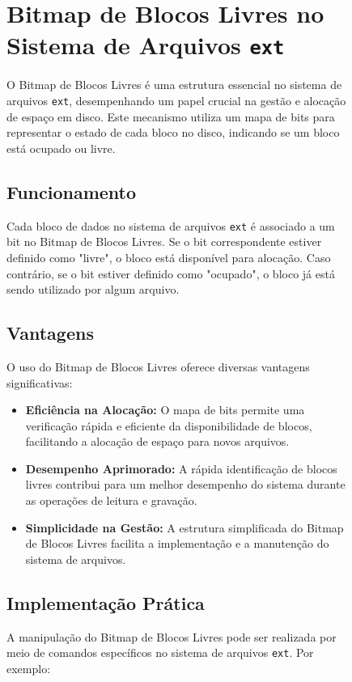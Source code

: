 \documentclass[
	12pt,				%
	openright,			%
	oneside,			%
	a4paper,			%
	chapter=TITLE,		%
	english,			%
	french,				%
	spanish,			%
	brazil				%
	]{abntex2}
\theoremstyle{definition}
\begin{document}
\begin{figure}[H]
    \centering\section{Bitmap de Blocos Livres no Sistema de Arquivos \texttt{ext}}
	O Bitmap de Blocos Livres é uma estrutura essencial no sistema de arquivos \texttt{ext}, desempenhando um papel crucial na gestão e alocação de espaço em disco. Este mecanismo utiliza um mapa de bits para representar o estado de cada bloco no disco, indicando se um bloco está ocupado ou livre.
	
	\subsection{Funcionamento}
	Cada bloco de dados no sistema de arquivos \texttt{ext} é associado a um bit no Bitmap de Blocos Livres. Se o bit correspondente estiver definido como "livre", o bloco está disponível para alocação. Caso contrário, se o bit estiver definido como "ocupado", o bloco já está sendo utilizado por algum arquivo.
	
	\subsection{Vantagens}
	O uso do Bitmap de Blocos Livres oferece diversas vantagens significativas:
	
	\begin{itemize}
		\item \textbf{Eficiência na Alocação:} O mapa de bits permite uma verificação rápida e eficiente da disponibilidade de blocos, facilitando a alocação de espaço para novos arquivos.
		
		\item \textbf{Desempenho Aprimorado:} A rápida identificação de blocos livres contribui para um melhor desempenho do sistema durante as operações de leitura e gravação.
		
		\item \textbf{Simplicidade na Gestão:} A estrutura simplificada do Bitmap de Blocos Livres facilita a implementação e a manutenção do sistema de arquivos.
	\end{itemize}
	
	\subsection{Implementação Prática}
	A manipulação do Bitmap de Blocos Livres pode ser realizada por meio de comandos específicos no sistema de arquivos \texttt{ext}. Por exemplo:
	

\end{figure}
\end{document}
